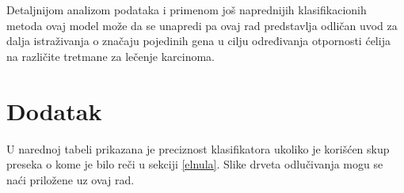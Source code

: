 \documentclass[a4paper]{article}
\begin{document}
Detaljnijom analizom podataka i primenom još naprednijih klasifikacionih metoda ovaj model može da se unapredi pa ovaj rad predstavlja odličan uvod za dalja istraživanja o značaju pojedinih gena u cilju određivanja otpornosti ćelija na različite tretmane za lečenje karcinoma. 

\appendix
 


\newpage
\appendix
\section{Dodatak}
\label{dodatak}

U narednoj tabeli prikazana je preciznost klasifikatora ukoliko je korišćen skup preseka o kome je bilo reči u sekciji \ref{elnula}. Slike drveta odlučivanja mogu se naći priložene uz ovaj rad.
\end{document}
